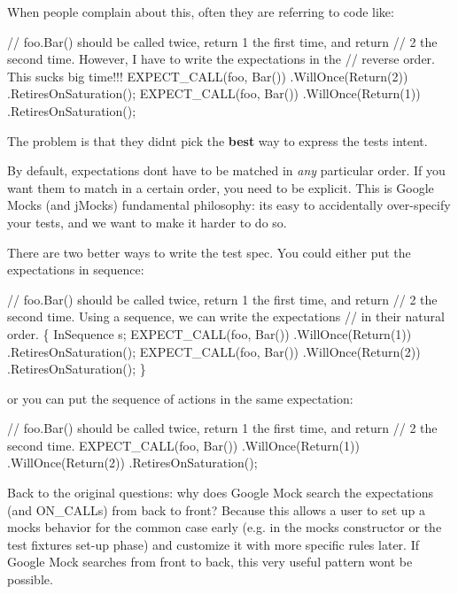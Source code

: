 When people complain about this, often they are referring to code like\+:


\begin{DoxyCode}
// foo.Bar() should be called twice, return 1 the first time, and return
// 2 the second time.  However, I have to write the expectations in the
// reverse order.  This sucks big time!!!
EXPECT\_CALL(foo, Bar())
    .WillOnce(Return(2))
    .RetiresOnSaturation();
EXPECT\_CALL(foo, Bar())
    .WillOnce(Return(1))
    .RetiresOnSaturation();
\end{DoxyCode}


The problem is that they didn\textquotesingle{}t pick the {\bfseries best} way to express the test\textquotesingle{}s intent.

By default, expectations don\textquotesingle{}t have to be matched in {\itshape any} particular order. If you want them to match in a certain order, you need to be explicit. This is Google Mock\textquotesingle{}s (and j\+Mock\textquotesingle{}s) fundamental philosophy\+: it\textquotesingle{}s easy to accidentally over-\/specify your tests, and we want to make it harder to do so.

There are two better ways to write the test spec. You could either put the expectations in sequence\+:


\begin{DoxyCode}
// foo.Bar() should be called twice, return 1 the first time, and return
// 2 the second time.  Using a sequence, we can write the expectations
// in their natural order.
\{
  InSequence s;
  EXPECT\_CALL(foo, Bar())
      .WillOnce(Return(1))
      .RetiresOnSaturation();
  EXPECT\_CALL(foo, Bar())
      .WillOnce(Return(2))
      .RetiresOnSaturation();
\}
\end{DoxyCode}


or you can put the sequence of actions in the same expectation\+:


\begin{DoxyCode}
// foo.Bar() should be called twice, return 1 the first time, and return
// 2 the second time.
EXPECT\_CALL(foo, Bar())
    .WillOnce(Return(1))
    .WillOnce(Return(2))
    .RetiresOnSaturation();
\end{DoxyCode}


Back to the original questions\+: why does Google Mock search the expectations (and {\ttfamily O\+N\+\_\+\+C\+A\+LL}s) from back to front? Because this allows a user to set up a mock\textquotesingle{}s behavior for the common case early (e.\+g. in the mock\textquotesingle{}s constructor or the test fixture\textquotesingle{}s set-\/up phase) and customize it with more specific rules later. If Google Mock searches from front to back, this very useful pattern won\textquotesingle{}t be possible.

